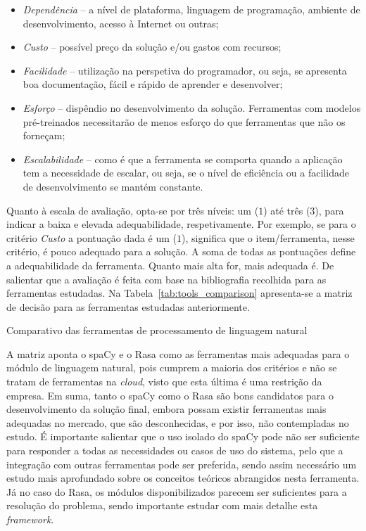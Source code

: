 \begin{itemize}
    \item
    {
        \textit{Dependência} -- a nível de plataforma, linguagem de programação, ambiente de desenvolvimento, acesso à Internet ou outras;
    }
    \item
    {
        \textit{Custo} -- possível preço da solução e/ou gastos com recursos;  
    }
    \item
    {
        \textit{Facilidade} -- utilização na perspetiva do programador, ou seja, se apresenta boa documentação, fácil e rápido de aprender e desenvolver;
    }
    \item
    {
        \textit{Esforço} -- dispêndio no desenvolvimento da solução. Ferramentas com modelos pré-treinados necessitarão de menos esforço do que ferramentas que não os forneçam;
    }
    \item
    {
        \textit{Escalabilidade} -- como é que a ferramenta se comporta quando a aplicação tem a necessidade de escalar, ou seja, se o nível de eficiência ou a facilidade de desenvolvimento se mantém constante.
    }
\end{itemize}

Quanto à escala de avaliação, opta-se por três níveis: um ($1$) até três ($3$), para indicar a baixa e elevada adequabilidade, respetivamente. Por exemplo, se para o critério \textit{Custo} a pontuação dada é um ($1$), significa que o item/ferramenta, nesse critério, é pouco adequado para a solução. A soma de todas as pontuações define a adequabilidade da ferramenta. Quanto mais alta for, mais adequada é. De salientar que a avaliação é feita com base na bibliografia recolhida para as ferramentas estudadas. Na Tabela~\ref{tab:tools_comparison} apresenta-se a matriz de decisão para as ferramentas estudadas anteriormente.
%
\begin{table}
\caption{Comparativo das ferramentas de processamento de linguagem natural}
\label{tab:tools_comparison}
\centering
\resizebox{\textwidth}{!}{
\renewcommand{\arraystretch}{1.3}
\footnotesize

}
\end{table}

A matriz aponta o spaCy e o Rasa como as ferramentas mais adequadas para o módulo de linguagem natural, pois cumprem a maioria dos critérios e não se tratam de ferramentas na \textit{cloud}, visto que esta última é uma restrição da empresa. Em suma, tanto o spaCy como o Rasa são bons candidatos para o desenvolvimento da solução final, embora possam existir ferramentas mais adequadas no mercado, que são desconhecidas, e por isso, não contempladas no estudo. É importante salientar que o uso isolado do spaCy pode não ser suficiente para responder a todas as necessidades ou casos de uso do sistema, pelo que a integração com outras ferramentas pode ser preferida, sendo assim necessário um estudo mais aprofundado sobre os conceitos teóricos abrangidos nesta ferramenta. Já no caso do Rasa, os módulos disponibilizados parecem ser suficientes para a resolução do problema, sendo importante estudar com mais detalhe esta \textit{framework}.

